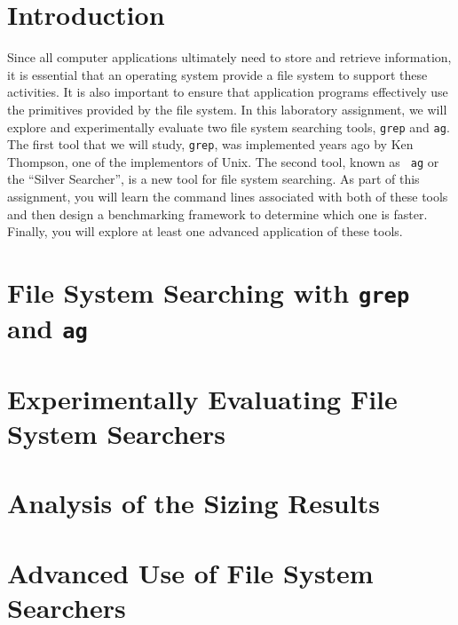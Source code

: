 


\usepackage[compact]{titlesec}



\section*{Introduction}

Since all computer applications ultimately need to store and retrieve information, it is essential that an operating
system  provide a file system to support these activities.  It is also important to ensure that application programs
effectively use the primitives provided by the file system.  In this laboratory assignment, we will explore and
experimentally evaluate two file system searching tools, {\tt grep} and {\tt ag}. The first tool that we will study,
{\tt grep}, was implemented years ago by Ken Thompson, one of the implementors of Unix.  The second tool, known as {\tt
ag} or the ``Silver Searcher'', is a new tool for file system searching. As part of this assignment, you will learn the
command lines associated with both of these tools and then design a benchmarking framework to determine which one is
faster.  Finally, you will explore at least one advanced application of these tools.

\section*{File System Searching with {\tt grep} and {\tt ag}}

\section*{Experimentally Evaluating File System Searchers}

\section*{Analysis of the Sizing Results}

\section*{Advanced Use of File System Searchers}

